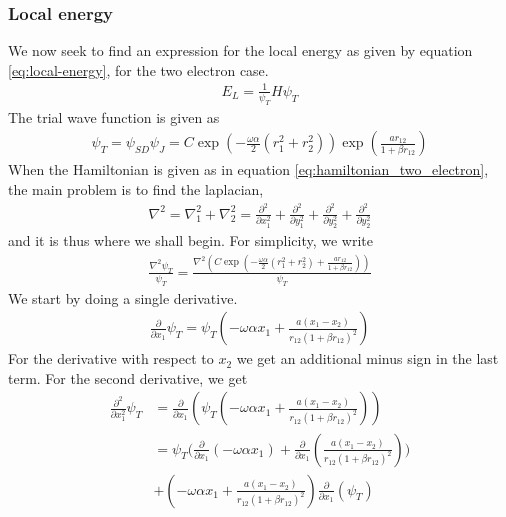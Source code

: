 \documentclass[11pt]{article}
\begin{document}
\subsubsection{Local energy}
We now seek to find an expression for the local energy as given by equation \eqref{eq:local-energy}, for the two electron case.
\begin{align}
	E_L = \frac{1}{\psi_T}H\psi_T
\end{align}
The trial wave function is given as
\begin{align}
	\psi_T = \psi_{SD} \psi_J = C\exp\left( -\frac{\omega \alpha}{2}\left(r_1^2 + r_2^2\right)\right) \exp\left(\frac{ar_{12}}{1+\beta r_{12}} \right)
	\label{eq:trail-WF-2-electron-jastrow}
\end{align}
When the Hamiltonian is given as in equation \eqref{eq:hamiltonian_two_electron}, the main problem is to find the laplacian, 
\begin{align*}
	\nabla^2 = \nabla_1^2 + \nabla_2^2 = \frac{\partial^2}{\partial x_1^2} + \frac{\partial^2}{\partial y_1^2} + \frac{\partial^2}{\partial y_2^2} + \frac{\partial^2}{\partial y_2^2}
\end{align*}
and it is thus where we shall begin. For simplicity, we write
\begin{align*}
	\frac{\nabla^2 \psi_T}{\psi_T} = \frac{\nabla^2 \left( C\exp\left( -\frac{\omega \alpha}{2}\left(r_1^2 + r_2^2\right) + \frac{ar_{12}}{1+\beta r_{12}} \right) \right)}{\psi_T}
\end{align*}
We start by doing a single derivative.
\begin{align}
	\frac{\partial}{\partial x_1} \psi_T = \psi_T\left(-\omega\alpha x_1 + \frac{a(x_1-x_2)}{r_{12}(1+\beta r_{12})^2} \right)
	\label{eq:two-electron-first-derivative}
\end{align}
For the derivative with respect to $x_2$ we get an additional minus sign in the last term. For the second derivative, we get
\begin{align*}
	\frac{\partial^2}{\partial x_1^2} \psi_T &= \frac{\partial}{\partial x_1} \left(\psi_T\left(-\omega\alpha x_1 + \frac{a(x_1-x_2)}{r_{12}(1+\beta r_{12})^2} \right)\right) \\
	&=\psi_T \bigg( \frac{\partial}{\partial x_1}\left(-\omega\alpha x_1\right) + \frac{\partial}{\partial x_1}\left( \frac{a(x_1-x_2)}{r_{12}(1+\beta r_{12})^2} \right) \bigg) \\
	&+ \left(-\omega\alpha x_1 + \frac{a(x_1-x_2)}{r_{12}(1+\beta r_{12})^2}\right) \frac{\partial}{\partial x_1}\left(\psi_T\right) \\
\end{align*}
\end{document}
